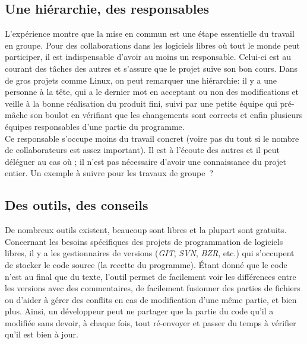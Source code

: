 \documentclass[10pt]{../fiche}
\begin{document}
\vspace{-.3cm}
\subsection*{Une hiérarchie, des responsables}
\vspace{-.1cm}
L'expérience montre que la mise en commun est une étape essentielle du travail en groupe. Pour des collaborations dans les logiciels libres où tout le monde peut participer, il est indispensable d'avoir au moins un responsable. Celui-ci est au courant des tâches des autres et s'assure que le projet suive son bon cours.
Dans de gros projets comme Linux, on peut remarquer une hiérarchie: il y a une personne à la tête, qui a le dernier mot en acceptant ou non des modifications et veille à la bonne réalisation du produit fini, suivi par une petite équipe qui pré-mâche son boulot en vérifiant que les changements sont corrects et enfin plusieurs équipes responsables d'une partie du programme.\\

Ce responsable s'occupe moins du travail concret (voire pas du tout si le nombre de collaborateurs est assez important). Il est à l'écoute des autres et il peut déléguer au cas où ; il n'est pas nécessaire d'avoir une connaissance du projet entier.
Un exemple à suivre pour les travaux de groupe~?

\vspace{-.3cm}
\subsection*{Des outils, des conseils}
\vspace{-.1cm}
De nombreux outils existent, beaucoup sont libres et la plupart sont gratuits.
Concernant les besoins spécifiques des projets de programmation de logiciels libres, il y a les gestionnaires de versions (\textit{GIT}, \textit{SVN}, \textit{BZR}, etc.) qui s'occupent de stocker le code source (la recette du programme). Étant donné que le code n'est au final que du texte, l'outil permet de facilement voir les différences entre les versions avec des commentaires, de facilement fusionner des parties de fichiers ou d'aider à gérer des conflits en cas de modification d'une même partie, et bien plus. Ainsi, un développeur peut ne partager que la partie du code qu'il a modifiée sans devoir, à chaque fois, tout ré-envoyer et passer du temps à vérifier qu'il est bien à jour.\\
\end{document}

